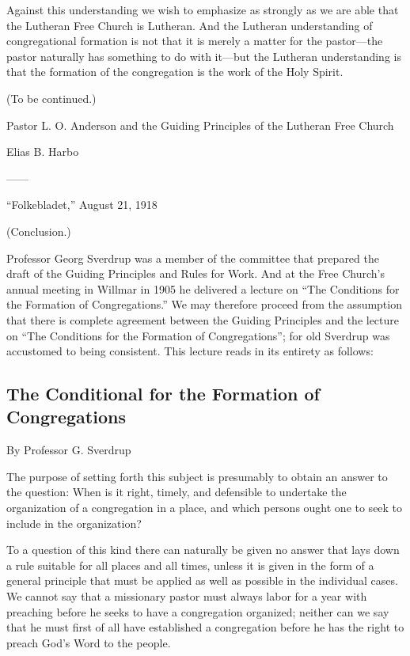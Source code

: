 Against this understanding we wish to emphasize as strongly as we are able that the Lutheran Free Church is Lutheran. And the Lutheran understanding of congregational formation is not that it is merely a matter for the pastor—the pastor naturally has something to do with it—but the Lutheran understanding is that the formation of the congregation is the work of the Holy Spirit.

(To be continued.)

Pastor L. O. Anderson and the Guiding Principles
of the Lutheran Free Church

Elias B. Harbo

——

“Folkebladet,” August 21, 1918

(Conclusion.)

Professor Georg Sverdrup was a member of the committee that prepared the draft of the Guiding Principles and Rules for Work. And at the Free Church’s annual meeting in Willmar in 1905 he delivered a lecture on “The Conditions for the Formation of Congregations.” We may therefore proceed from the assumption that there is complete agreement between the Guiding Principles and the lecture on “The Conditions for the Formation of Congregations”; for old Sverdrup was accustomed to being consistent. This lecture reads in its entirety as follows:

\subsection{The Conditional for the Formation of Congregations}

By Professor G. Sverdrup

The purpose of setting forth this subject is presumably to obtain an answer to the question: When is it right, timely, and defensible to undertake the organization of a congregation in a place, and which persons ought one to seek to include in the organization?

To a question of this kind there can naturally be given no answer that lays down a rule suitable for all places and all times, unless it is given in the form of a general principle that must be applied as well as possible in the individual cases. We cannot say that a missionary pastor must always labor for a year with preaching before he seeks to have a congregation organized; neither can we say that he must first of all have established a congregation before he has the right to preach God’s Word to the people.

